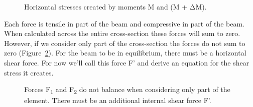 \documentclass[
  letterpaper,
  DIV=11,
  numbers=noendperiod]{scrreprt}
\theoremstyle{definition}
\theoremstyle{remark}
\begin{document}
\begin{figure}


\caption{\label{fig-10.9}Horizontal stresses created by moments M and (M
+ ΔM).}

\end{figure}%

Each force is tensile in part of the beam and compressive in part of the
beam. When calculated across the entire cross-section these forces will
sum to zero. However, if we consider only part of the cross-section the
forces do not sum to zero (Figure~\ref{fig-10.10}). For the beam to be
in equilibrium, there must be a horizontal shear force. For now we'll
call this force F' and derive an equation for the shear stress it
creates.

\begin{figure}


\caption{\label{fig-10.10}Forces F\textsubscript{1} and
F\textsubscript{2} do not balance when considering only part of the
element. There must be an additional internal shear force F'.}

\end{figure}%
\end{document}
